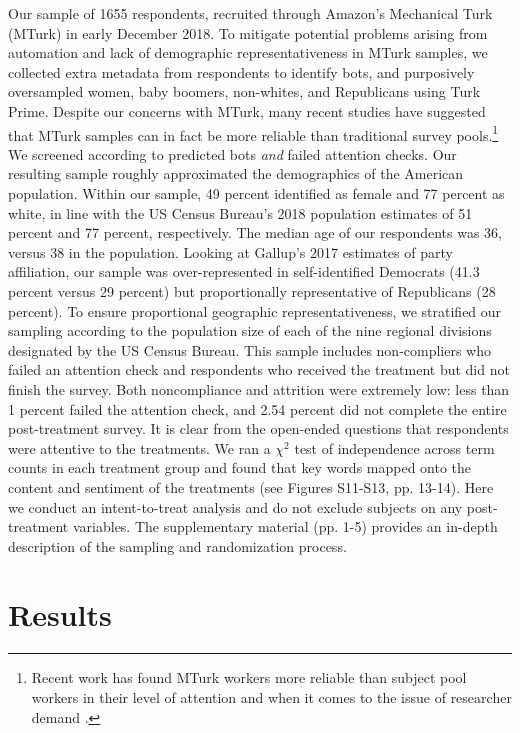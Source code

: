 Our sample of 1655 respondents, recruited through Amazon's Mechanical Turk (MTurk) in early December 2018. To mitigate potential problems arising from automation and lack of demographic representativeness in MTurk samples, we collected extra metadata from respondents to identify bots, and purposively oversampled women, baby boomers, non-whites, and Republicans using Turk Prime. Despite our concerns with MTurk, many recent studies have suggested that MTurk samples can in fact be more reliable than traditional survey pools.\footnote{Recent work has found MTurk workers more reliable than subject pool workers in their level of attention \citep{white_strezhnev_lucas_kruszewska_huff_2018} and when it comes to the issue of researcher demand \citep{Hauser2016}.} We screened according to predicted bots {\it and} failed attention checks. Our resulting sample roughly approximated the demographics of the American population. Within our sample, 49 percent identified as female and 77 percent as white, in line with the US Census Bureau's 2018 population estimates of 51 percent and 77 percent, respectively. The median age of our respondents was 36, versus 38 in the population. Looking at Gallup's 2017 estimates of party affiliation, our sample was over-represented in self-identified Democrats (41.3 percent versus 29 percent) but proportionally representative of Republicans (28 percent). To ensure proportional geographic representativeness, we stratified our sampling according to the population size of each of the nine regional divisions designated by the US Census Bureau. This sample includes non-compliers who failed an attention check and respondents who received the treatment but did not finish the survey. Both noncompliance and attrition were extremely low: less than 1 percent failed the attention check, and 2.54 percent did not complete the entire post-treatment survey. It is clear from the open-ended questions that respondents were attentive to the treatments. We ran a $\chi^2$ test of independence across term counts in each treatment group and found that key words mapped onto the content and sentiment of the treatments (see Figures S11-S13, pp. 13-14). Here we conduct an intent-to-treat analysis and do not exclude subjects on any post-treatment variables. The supplementary material (pp. 1-5) provides an in-depth description of the sampling and randomization process.

\section{Results}

